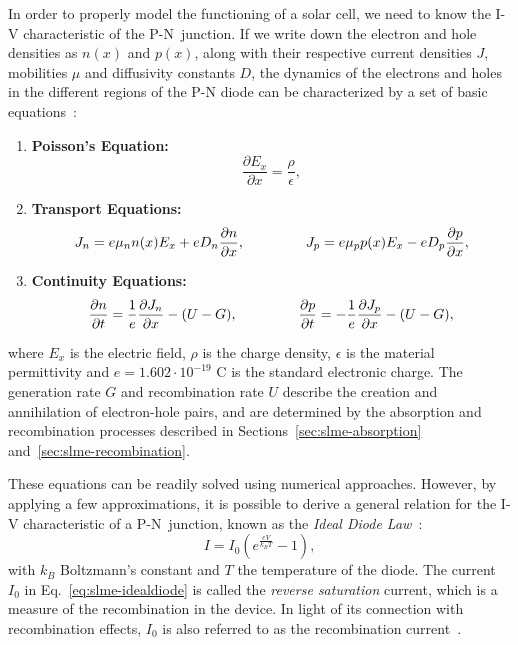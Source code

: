 \begin{refsection}
In order to properly model the functioning of a solar cell, we need to know 
the I-V characteristic of the P-N~junction. If we write down the electron and 
hole densities as $n(x)$ and $p(x)$, along with their respective current 
densities $J$, mobilities $\mu$ and diffusivity constants $D$, the dynamics of 
the electrons and holes in the different regions of the P-N diode can be 
characterized by a set of basic equations~\cite{Shockley1949}: 
\vspace{0.1in} 
\begin{enumerate} 
\item \textbf{Poisson's Equation: } \begin{equation}\frac{\partial 
E_x}{\partial x} = \frac{\rho}{\epsilon},\end{equation} 
 
\item \textbf{Transport Equations: } \begin{equation}J_n = e \mu_n n(x) E_x + 
e D_n\frac{\partial n }{\partial x}, \hspace{0.6in} J_p = e \mu_p p(x) E_x - e 
D_p \frac{\partial p}{\partial x},\end{equation} 
 
\item \textbf{Continuity Equations: } \begin{equation}\frac{\partial 
n}{\partial t} = \frac{1}{e} \frac{\partial J_n}{\partial x} - (U - G), 
\hspace{0.6in} \frac{\partial p}{\partial t} = - \frac{1}{e} \frac{\partial 
J_p}{\partial x} - (U - G),\end{equation} 
 
\end{enumerate} 
where $E_x$ is the electric field, $\rho$ is the charge density, $\epsilon$ is 
the material permittivity and $e = 1.602\cdot 10^{-19}$ C is the standard 
electronic charge. The generation rate $G$ and recombination rate $U$ describe 
the creation and annihilation of electron-hole pairs, and are determined by 
the absorption and recombination processes described in 
Sections~\ref{sec:slme-absorption} and~\ref{sec:slme-recombination}.  
 
These equations can be readily solved using numerical approaches. However, by 
applying a few approximations, it is possible to derive a general relation for 
the I-V characteristic of a P-N~junction, known as the \textit{Ideal Diode 
Law}~\cite{Shockley1949}: 
\begin{equation}\label{eq:slme-idealdiode} 
I = I_0 (e^\frac{e V}{k_B T} - 1), 
\end{equation} 
with $k_B$ Boltzmann's constant and $T$ the temperature of the diode. The 
current $I_0$ in Eq.~\ref{eq:slme-idealdiode} is called the \textit{reverse 
saturation} current, which is a measure of the recombination in the device. In 
light of its connection with recombination effects, $I_0$ is also referred to 
as the recombination current~\cite{Cuevas2014}. 
 

\end{refsection}
